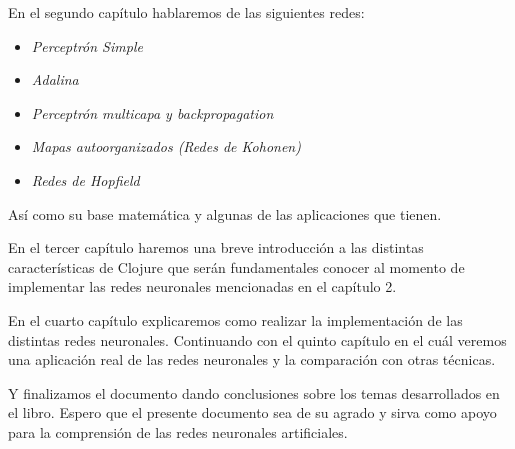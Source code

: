 \begin{prefacio}
  En el segundo capítulo hablaremos de las siguientes redes:

  \begin{itemize}
  \item \textsl{Perceptrón Simple}
  \item \textsl{Adalina}
  \item \textsl{Perceptrón multicapa y backpropagation}
  \item \textsl{Mapas autoorganizados (Redes de Kohonen)}
  \item \textsl{Redes de Hopfield}
  \end{itemize}

  Así como su base matemática y algunas de las aplicaciones que
  tienen.

  En el tercer capítulo haremos una breve introducción a las distintas
  características de Clojure que serán fundamentales conocer al
  momento de implementar las redes neuronales mencionadas en el
  capítulo 2.

  En el cuarto capítulo explicaremos como realizar la implementación
  de las distintas redes neuronales. Continuando con el quinto
  capítulo en el cuál veremos una aplicación real de las redes
  neuronales y la comparación con otras técnicas.

  Y finalizamos el documento dando conclusiones sobre los temas
  desarrollados en el libro. Espero que el presente documento sea de
  su agrado y sirva como apoyo para la comprensión de las redes
  neuronales artificiales.


\end{prefacio}